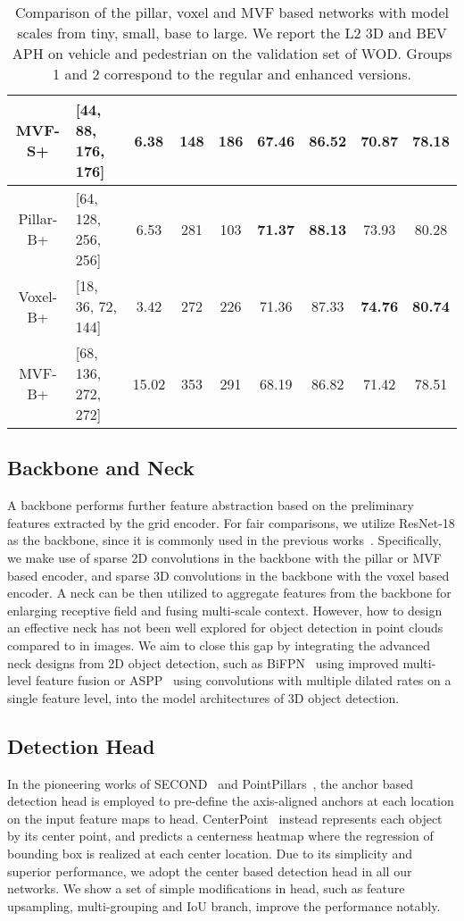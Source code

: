 \documentclass[10pt,twocolumn,letterpaper]{article}
\begin{document}
\begin{table*}[t]
\begin{tabular}{c|lccc|cc|cc}
\rowcolor[HTML]{EFEFEF} MVF-S+ & [44, 88, 176, 176] & 6.38 & 148 & 186 & 67.46 & 86.52 & 70.87 & 78.18  \\ \hline
\rowcolor[HTML]{EFEFEF} Pillar-B+ & [64, 128, 256, 256] & 6.53 & 281 & 103 &   \textbf{71.37} & \textbf{88.13} & 73.93 & 80.28 \\
\rowcolor[HTML]{EFEFEF} Voxel-B+ & [18, 36, 72, 144]  & 3.42 & 272 & 226  &  71.36 & 87.33 & \textbf{74.76} & \textbf{80.74} \\
\rowcolor[HTML]{EFEFEF} MVF-B+ & [68, 136, 272, 272] & 15.02 & 353 & 291  &  68.19 & 86.82 & 71.42 & 78.51 \\ \hline 
\end{tabular}
\caption{Comparison of the pillar, voxel and MVF based networks with model scales from tiny, small, base to large. We report the L2 3D and BEV APH on vehicle and pedestrian on the validation set of WOD. Groups 1 and 2 correspond to the regular and enhanced versions.}  
\label{tab:capacity}
\end{table*}


\subsection{Backbone and Neck}
A backbone performs further feature abstraction based on the preliminary features extracted by the grid encoder. For fair comparisons, we utilize ResNet-18 as the backbone, since it is commonly used in the previous works~\cite{zhu2019class,yin2021center,shi2022pillarnet}. Specifically, we make use of sparse 2D convolutions in the backbone with the pillar or MVF based encoder, and sparse 3D convolutions in the backbone with the voxel based encoder. A neck can be then utilized to aggregate features from the backbone for enlarging receptive field and fusing multi-scale context. However, how to design an effective neck has not been well explored for object detection in point clouds compared to in images. We aim to close this gap by integrating the advanced neck designs from 2D object detection, such as BiFPN~\cite{tan2020efficientdet} using improved multi-level feature fusion or ASPP~\cite{Chen_2018_PAMI} using convolutions with multiple dilated rates on a single feature level, into the model architectures of 3D object detection. 


\subsection{Detection Head}
In the pioneering works of SECOND~\cite{yan2018second} and PointPillars~\cite{lang2019pointpillars}, the anchor based detection head is employed to pre-define the axis-aligned anchors at each location on the input feature maps to head. CenterPoint~\cite{yin2021center} instead represents each object by its center point, and predicts a centerness heatmap where the regression of bounding box is realized at each center location. 
Due to its simplicity and superior performance, we adopt the center based detection head in all our networks. We show a set of simple modifications in head, such as feature upsampling, multi-grouping and IoU branch, improve the performance notably.  
\end{document}
